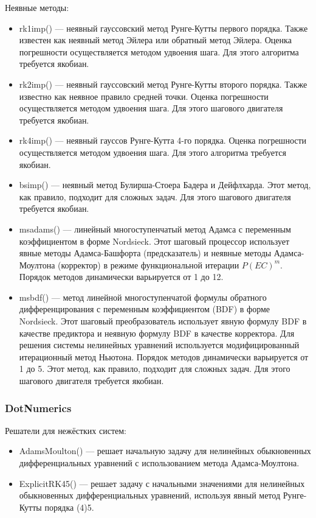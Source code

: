 Неявные методы:
\begin{itemize}
    \item rk1imp() — неявный гауссовский метод Рунге-Кутты первого порядка. Также известен как неявный метод Эйлера или обратный метод Эйлера. Оценка погрешности осуществляется методом удвоения шага. Для этого алгоритма требуется якобиан.
    \item rk2imp() — неявный гауссовский метод Рунге-Кутты второго порядка. Также известно как неявное правило средней точки. Оценка погрешности осуществляется методом удвоения шага. Для этого шагового двигателя требуется якобиан.
    \item rk4imp() — неявный гауссов Рунге-Кутта 4-го порядка. Оценка погрешности осуществляется методом удвоения шага. Для этого алгоритма требуется якобиан.
    \item bsimp() — неявный метод Булирша-Стоера Бадера и Дейфлхарда. Этот метод, как правило, подходит для сложных задач. Для этого шагового двигателя требуется якобиан.
    \item msadams() — линейный многоступенчатый метод Адамса с переменным коэффициентом в форме Nordsieck. Этот шаговый процессор использует явные методы Адамса-Башфорта (предсказатель) и неявные методы Адамса-Моултона (корректор) в режиме функциональной итерации $P(EC) ^m$. Порядок методов динамически варьируется от 1 до 12.
    \item msbdf() — метод линейной многоступенчатой формулы обратного дифференцирования с переменным коэффициентом (BDF) в форме Nordsieck. Этот шаговый преобразователь использует явную формулу BDF в качестве предиктора и неявную формулу BDF в качестве корректора. Для решения системы нелинейных уравнений используется модифицированный итерационный метод Ньютона. Порядок методов динамически варьируется от 1 до 5. Этот метод, как правило, подходит для сложных задач. Для этого шагового двигателя требуется якобиан.
\end{itemize}

\subsubsection{DotNumerics}

Решатели для нежёстких систем:
\begin{itemize}
    \item AdamsMoulton() — решает начальную задачу для нелинейных обыкновенных дифференциальных уравнений с использованием метода Адамса-Моултона.
    \item ExplicitRK45() — решает задачу с начальными значениями для нелинейных обыкновенных дифференциальных уравнений, используя явный метод Рунге-Кутты порядка (4)5.
\end{itemize}

